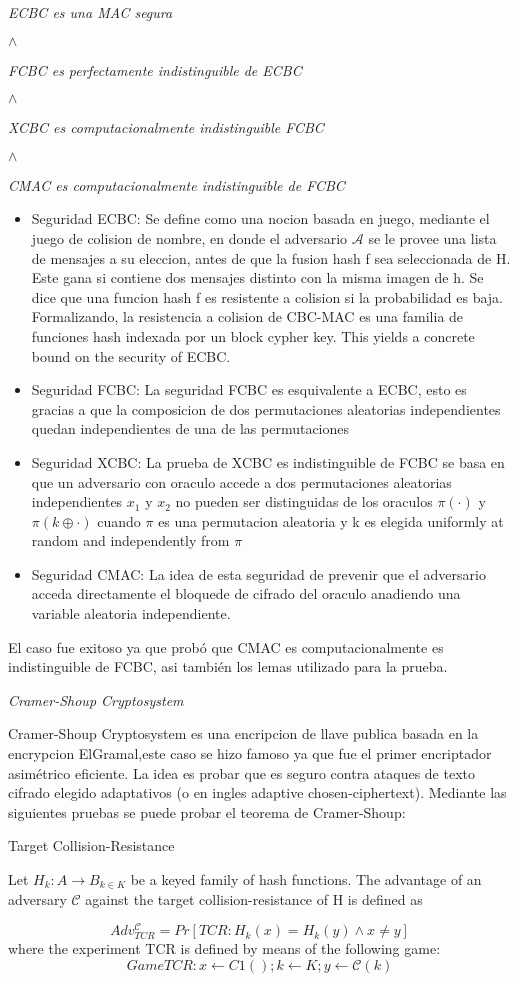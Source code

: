 \documentclass[runningheads,a4paper]{llncs}
\begin{document}
\centerline{\emph{ECBC es una MAC segura}}
\centerline{$\land$}
\centerline{\emph{FCBC es perfectamente indistinguible de ECBC}}
\centerline{$\land$}
\centerline{\emph{XCBC es computacionalmente indistinguible FCBC}}
\centerline{$\land$}
\centerline{\emph{CMAC es computacionalmente indistinguible de FCBC}}

\begin{itemize}
	\item Seguridad ECBC: Se define como una nocion basada en juego, mediante el juego de colision de nombre, en donde el adversario $\mathcal{A}$ se le provee una lista de mensajes a su eleccion, antes de que la fusion hash f sea seleccionada de H. Este gana si contiene dos mensajes distinto con la misma imagen de h. Se dice que una funcion hash f es resistente a colision si la probabilidad es baja. Formalizando, la resistencia a colision de CBC-MAC es una familia de funciones hash indexada por un block cypher key. This yields a concrete bound on the security of ECBC. 
	\item Seguridad FCBC: La seguridad FCBC es esquivalente a ECBC, esto es gracias a que la composicion de dos permutaciones aleatorias independientes quedan independientes de una de las permutaciones 
	\item Seguridad XCBC: La prueba de XCBC es indistinguible de FCBC se basa en que un adversario con oraculo accede a dos permutaciones aleatorias independientes $x_1$ y $x_2$ no pueden ser distinguidas de los oraculos $\pi (\cdot)$ y $\pi (k \oplus \cdot)$ cuando $\pi$ es una permutacion aleatoria y k es elegida uniformly at random and independently from $\pi$
	\item Seguridad CMAC: La idea de esta seguridad de prevenir que el adversario acceda directamente el bloquede de cifrado del oraculo anadiendo una variable aleatoria independiente.
\end{itemize}
El caso fue exitoso ya que probó que CMAC es computacionalmente es indistinguible de FCBC, asi también los lemas utilizado para la prueba.\cite{article5}


\centerline{\emph{Cramer-Shoup Cryptosystem}}

Cramer-Shoup Cryptosystem es una encripcion de llave publica basada en la encrypcion ElGramal,este caso se hizo famoso ya que fue el primer encriptador asimétrico eficiente. La idea es probar que es seguro contra ataques de texto cifrado elegido adaptativos (o en ingles adaptive chosen-ciphertext).
Mediante las siguientes pruebas se puede probar el teorema de Cramer-Shoup:
\begin{definition}{Target Collision-Resistance}

Let $H_k : A \rightarrow B_{k∈K}$ be a keyed family of hash
functions. The advantage of an adversary $\mathcal{C}$ against the target collision-resistance of H is defined as

	\[Adv_{TCR}^\mathcal{C} = Pr[TCR:H_k(x) = H_k (y) \land x \neq y]\]
	where the experiment TCR is defined by means of the following game:
	\[Game TCR : x \leftarrow C 1 ( ); k \leftarrow K; y \leftarrow \mathcal{C}(k)\]
\end{definition}
\end{document}
